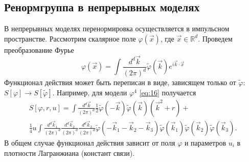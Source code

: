 \documentclass[a4paper,12pt]{article}
\theoremstyle{definition}
\theoremstyle{definition}
\theoremstyle{definition}
\begin{document}
\subsection{Ренормгруппа в непрерывных моделях}
\label{sec:renormgroup-general}
В непрерывных моделях перенормировка осуществляется в импульсном пространстве. Рассмотрим скалярное поле $\varphi(\vec x)$, где $\vec x\in \mathbb{R}^d$. Проведем преобразование Фурье
\begin{equation}
  \label{eq:64}
  \varphi(\vec x)=\int \frac{d^d \vec k}{(2\pi)^d}\tilde \varphi(\vec k) e^{i\vec k\cdot \vec x}
\end{equation}
Функционал действия может быть переписан в виде, зависящем только от $\tilde\varphi$: $S[\varphi]\to S[\tilde\varphi]$. Например, для модели $\varphi^4$ \eqref{eq:16} получается
\begin{multline}
  \label{eq:65}
  S[\varphi,r,u]=\int  \frac{d^d \vec k}{(2\pi)^d} \frac{1}{2} \tilde\varphi(-\vec k)\tilde\varphi(\vec k)(\vec k^2+r)+\\
  \frac{1}{4}u\int  \frac{d^d \vec k_1}{(2\pi)^d} \frac{d^d \vec k_2}{(2\pi)^d} \frac{d^d \vec k_3}{(2\pi)^d} \tilde\varphi(-\vec k_1-\vec k_2 -\vec k_3)\tilde \varphi(\vec k_1)\tilde\varphi (\vec k_2)\tilde\varphi(\vec k_3).
\end{multline}
В общем случае функционал действия зависит от поля $\varphi$ и параметров $u_i$ в плотности Лагранжиана (констант связи).
\end{document}
